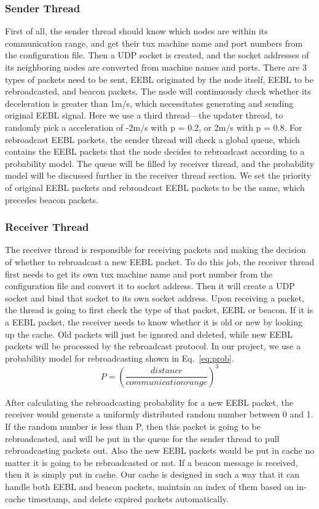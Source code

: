 \documentclass[twocolumn]{article}
\begin{document}
\subsubsection{Sender Thread}
\par{First of all, the sender thread should know which nodes are within its communication range, and get their tux machine name and port numbers from the configuration file. Then a UDP socket is created, and the socket addresses of its neighboring nodes are converted from machine names and ports. There are 3 types of packets need to be sent, EEBL originated by the node itself, EEBL to be rebroadcasted, and beacon packets. The node will continuously check whether its deceleration is greater than 1m/s, which necessitates generating and sending original EEBL signal. Here we use a third thread—the updater thread, to randomly pick a acceleration of -2m/s with p = 0.2, or 2m/s with p = 0.8. For rebroadcast EEBL packets, the sender thread will check a global queue, which contains the EEBL packets that the node decides to rebroadcast according to a probability model. The queue will be filled by receiver thread, and the probability model will be discussed further in the receiver thread section. We set the priority of original EEBL packets and rebroadcast EEBL packets to be the same, which precedes beacon packets. }
\subsubsection{Receiver Thread}
\par{The receiver thread is responsible for receiving packets and making the decision of whether to rebroadcast a new EEBL packet. To do this job, the receiver thread first needs to get its own tux machine name and port number from the configuration file and convert it to socket address. Then it will create a UDP socket and bind that socket to its own socket address. Upon receiving a packet, the thread is going to first check the type of that packet, EEBL or beacon. If it is a EEBL packet, the receiver needs to know whether it is old or new by looking up the cache. Old packets will just be ignored and deleted, while new EEBL packets will be processed by the rebroadcast protocol. In our project, we use a probability model for rebroadcasting shown in Eq.~\ref{eq:prob}. }
\begin{equation}
    P=(\frac{distance}{communication range})^3
    \label{eq:prob}
\end{equation}
\par{After calculating the rebroadcasting probability for a new EEBL packet, the receiver would generate a uniformly distributed random number between 0 and 1. If the random number is less than P, then this packet is going to be rebroadcasted, and will be put in the queue for the sender thread to pull rebroadcasting packets out. Also the new EEBL packets would be put in cache no matter it is going to be rebroadcasted or not. If a beacon message is received, then it is simply put in cache. Our cache is designed in such a way that it can handle both EEBL and beacon packets, maintain an index of them based on in-cache timestamp, and delete expired packets automatically.}
\end{document}
